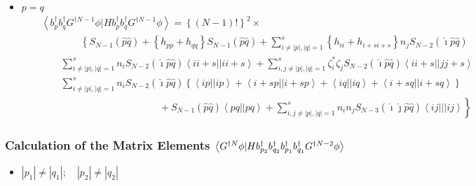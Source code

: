 \begin{itemize}
\begin{itemize}
\item $p=q$%
\begin{eqnarray}
&&\left\langle b_{p}^{\dagger }b_{q}^{\dagger }G^{\dagger N-1}\phi
|Hb_{p}^{\dagger }b_{q}^{\dagger }G^{\dagger N-1}\phi \right\rangle =\left\{
\left( N-1\right) !\right\} ^{2}\times  \nonumber \\
&&\qquad \qquad \left\{ S_{N-1}\left( \hat{p}\hat{q}\right) +\right. \left\{
h_{pp}+h_{qq}\right\} S_{N-1}\left( \hat{p}\hat{q}\right) +\sum_{i\neq
\left| p\right| ,\left| q\right| =1}^{s}\left\{ h_{ii}+h_{i+si+s}\right\}
n_{j}S_{N-2}\left( \hat{\imath}\hat{p}\hat{q}\right)  \nonumber \\
&&\left. {}\right. \qquad \sum_{i\neq \left| p\right| ,\left| q\right|
=1}^{s}n_{i}S_{N-2}\left( \hat{\imath}\hat{p}\hat{q}\right) \left\langle
ii+s||ii+s\right\rangle +\sum_{i,j\neq \left| p\right| ,\left| q\right|
=1}^{s}\zeta _{i}^{\ast }\zeta _{j}S_{N-2}\left( \hat{\imath}\hat{p}\hat{q}%
\right) \left\langle ii+s||jj+s\right\rangle  \nonumber \\
&&\left. {}\right. \qquad \sum_{i\neq \left| p\right| ,\left| q\right|
=1}^{s}n_{i}S_{N-2}\left( \hat{\imath}\hat{p}\hat{q}\right) \left\{
\left\langle ip||ip\right\rangle +\left\langle i+sp||i+sp\right\rangle
+\left\langle iq||iq\right\rangle +\left\langle i+sq||i+sq\right\rangle
\right\}  \nonumber \\
&&\qquad \qquad \qquad \qquad \qquad \qquad +\left. S_{N-1}(\hat{p}\hat{q}%
)\left\langle pq||pq\right\rangle +\sum_{i,j\neq \left| p\right| ,\left|
q\right| =1}^{s}n_{i}n_{j}S_{N-3}\left( \hat{\imath}\hat{\jmath}\hat{p}\hat{q%
}\right) \left\langle ij|||ij\right\rangle \right\}
\end{eqnarray}
\end{itemize}
\end{itemize}

\subsubsection{Calculation of the Matrix Elements $\left\langle G^{\dagger N}%
\protect\phi |Hb_{p_{2}}^{\dagger }b_{q_{2}}^{\dagger }b_{p_{1}}^{\dagger
}b_{q_{1}}^{\dagger }G^{\dagger N-2}\protect\phi \right\rangle $}

\begin{itemize}
\item $\left| p_{1}\right| \neq \left| q_{1}\right| ;\quad \left|
p_{2}\right| \neq \left| q_{2}\right| $
\end{itemize}

